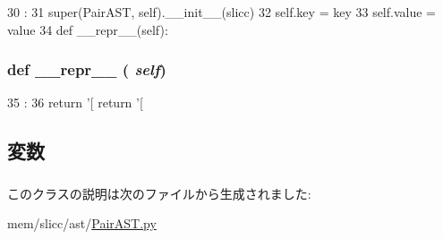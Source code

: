 \begin{DoxyCode}
30                                          :
31         super(PairAST, self).__init__(slicc)
32         self.key = key
33         self.value = value
34 
    def __repr__(self):
\end{DoxyCode}
\hypertarget{classslicc_1_1ast_1_1PairAST_1_1PairAST_ad8b9328939df072e4740cd9a63189744}{
\subsubsection[{\_\-\_\-repr\_\-\_\-}]{\setlength{\rightskip}{0pt plus 5cm}def \_\-\_\-repr\_\-\_\- ( {\em self})}}
\label{classslicc_1_1ast_1_1PairAST_1_1PairAST_ad8b9328939df072e4740cd9a63189744}



\begin{DoxyCode}
35                       :
36         return '[%
        return '[%
\end{DoxyCode}


\subsection{変数}
\hypertarget{classslicc_1_1ast_1_1PairAST_1_1PairAST_ab0d96f9d852c2058c2546a1338e87544}{
\subsubsection[{key}]{}}
\label{classslicc_1_1ast_1_1PairAST_1_1PairAST_ab0d96f9d852c2058c2546a1338e87544}
\hypertarget{classslicc_1_1ast_1_1PairAST_1_1PairAST_afcc7a4b78ecd8fa7e713f8cfa0f51017}{
\subsubsection[{value}]{}}
\label{classslicc_1_1ast_1_1PairAST_1_1PairAST_afcc7a4b78ecd8fa7e713f8cfa0f51017}


このクラスの説明は次のファイルから生成されました:\begin{DoxyCompactItemize}
\item 
mem/slicc/ast/\hyperlink{PairAST_8py}{PairAST.py}\end{DoxyCompactItemize}
